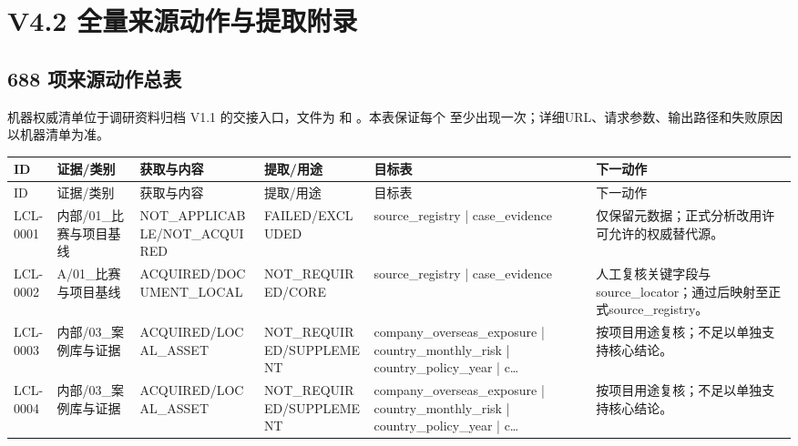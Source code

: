 \part{V4.2 全量来源动作与提取附录}
\chapter{688 项来源动作总表}
机器权威清单位于调研资料归档 V1.1 的交接入口，文件为  和 。本表保证每个  至少出现一次；详细URL、请求参数、输出路径和失败原因以机器清单为准。
\clearpage
\begin{landscape}\begingroup\setlength{\tabcolsep}{2pt}\scriptsize
\begin{longtable}{p{1.8cm}p{2.6cm}p{2.6cm}p{2.6cm}p{4.8cm}p{7.2cm}}
\toprule
ID & 证据/类别 & 获取与内容 & 提取/用途 & 目标表 & 下一动作\\
\midrule\endfirsthead
\toprule ID & 证据/类别 & 获取与内容 & 提取/用途 & 目标表 & 下一动作\\\midrule\endhead
LCL-0001 & 内部/\allowbreak{}01\_\allowbreak{}比赛与项目基线 & NOT\_\allowbreak{}APPLICABLE/\allowbreak{}NOT\_\allowbreak{}ACQUIRED & FAILED/\allowbreak{}EXCLUDED & source\_\allowbreak{}registry | case\_\allowbreak{}evidence & 仅保留元数据；正式分析改用许可允许的权威替代源。\\
LCL-0002 & A/\allowbreak{}01\_\allowbreak{}比赛与项目基线 & ACQUIRED/\allowbreak{}DOCUMENT\_\allowbreak{}LOCAL & NOT\_\allowbreak{}REQUIRED/\allowbreak{}CORE & source\_\allowbreak{}registry | case\_\allowbreak{}evidence & 人工复核关键字段与source\_\allowbreak{}locator；通过后映射至正式source\_\allowbreak{}registry。\\
LCL-0003 & 内部/\allowbreak{}03\_\allowbreak{}案例库与证据 & ACQUIRED/\allowbreak{}LOCAL\_\allowbreak{}ASSET & NOT\_\allowbreak{}REQUIRED/\allowbreak{}SUPPLEMENT & company\_\allowbreak{}overseas\_\allowbreak{}exposure | country\_\allowbreak{}monthly\_\allowbreak{}risk | country\_\allowbreak{}policy\_\allowbreak{}year | c… & 按项目用途复核；不足以单独支持核心结论。\\
LCL-0004 & 内部/\allowbreak{}03\_\allowbreak{}案例库与证据 & ACQUIRED/\allowbreak{}LOCAL\_\allowbreak{}ASSET & NOT\_\allowbreak{}REQUIRED/\allowbreak{}SUPPLEMENT & company\_\allowbreak{}overseas\_\allowbreak{}exposure | country\_\allowbreak{}monthly\_\allowbreak{}risk | country\_\allowbreak{}policy\_\allowbreak{}year | c… & 按项目用途复核；不足以单独支持核心结论。\\

\end{longtable}
\end{landscape}
